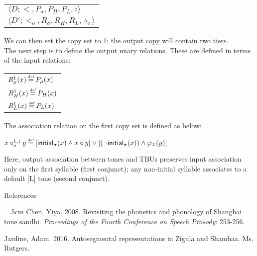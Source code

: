 \documentclass{article}
\newcommand\myeq{\mathrel{\stackrel{\makebox[0pt]{\mbox{\normalfont\tiny def}}}{=}}}
\begin{document}
\begin{center}
\begin{tabular}{l}
$\langle D; <, P_{\sigma}, P_{H}, P_{L}, \circ \rangle$\\
$\langle D'; <_{o}, R_{\sigma}, R_{H}, R_{L}, \circ_{o} \rangle$\\
\end{tabular}
\end{center}
We can then set the copy set to {1}; the output copy will contain two tiers.\\
The next step is to define the output unary relations. These are defined in terms of the input relations:
\begin{center}
\begin{tabular}{l}
$R^{1}_{\mu}(x) \myeq P_{\mu}(x)$\\
$R^{1}_{H}(x) \myeq P_{H}(x)$\\
$R^{1}_{L}(x) \myeq P_{L}(x)$\\
\end{tabular}
\end{center}
The association relation on the first copy set is defined as below:
\begin{center}
$x \circ^{1,1}_{o} y \myeq [\mathsf{initial}_{\sigma}(x) \wedge x \circ y] \vee [(\neg  \mathsf{initial}_{\sigma}(x)) \wedge \varphi_{L}(y)]$
\end{center}
Here, output association between tones and TBUs preserves input association only on the first syllable (first conjunct); any non-initial syllable associates to a default [L] tone (second conjunct).
\pagebreak
\begin{center} References \end{center}
\smallskip{}
\hangindent=.5cm
Chen, Yiya. 2008. Revisiting the phonetics and phonology of Shanghai tone sandhi. \textit{Proceedings of the Fourth Conference on Speech Prosody}: 253-256.\\
\par \noindent
Jardine, Adam. 2016. Autosegmental representations in Zigula and Shambaa. Ms, Rutgers.
\end{document}
